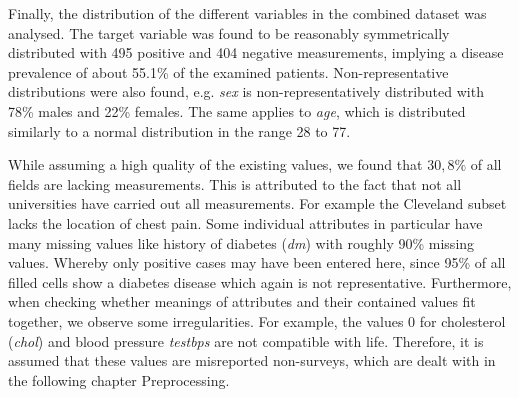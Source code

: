 Finally, the distribution of the different variables in the combined dataset was analysed. The target variable was found to be reasonably symmetrically distributed with 495 positive and 404 negative measurements, implying a disease prevalence of about 55.1\% of the examined patients. Non-representative distributions were also found, e.g. \textit{sex} is non-representatively distributed with 78\% males and 22\% females. The same applies to \textit{age}, which is distributed similarly to a normal distribution in the range 28 to 77.

While assuming a high quality of the existing values, we found that $30,8\%$ of all fields are lacking measurements. This is attributed to the fact that not all universities have carried out all measurements. For example the Cleveland subset lacks the location of chest pain. Some individual attributes in particular have many missing values like history of diabetes (\textit{dm}) with roughly 90\% missing values. Whereby only positive cases may have been entered here, since 95\% of all filled cells show a diabetes disease which again is not representative. Furthermore, when checking whether meanings of attributes and their contained values fit together, we observe some irregularities. For example, the values 0 for cholesterol (\textit{chol}) and blood pressure \textit{testbps} are not compatible with life. Therefore, it is assumed that these values are misreported non-surveys, which are dealt with in the following chapter Preprocessing.
